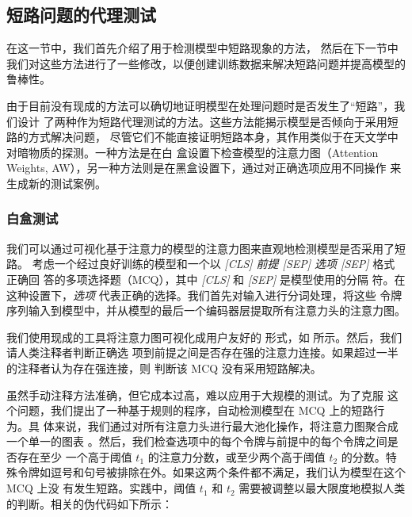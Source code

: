 \subsection{短路问题的代理测试}
\label{sec3:approach1}
在这一节中，我们首先介绍了用于检测模型中短路现象的方法，
然后在下一节中我们对这些方法进行了一些修改，以便创建训练数据来解决短路问题并提高模型的鲁棒性。

由于目前没有现成的方法可以确切地证明模型在处理问题时是否发生了``短路''，我们设计
了两种作为短路代理测试的方法。这些方法能揭示模型是否倾向于采用短路的方式解决问题，
尽管它们不能直接证明短路本身，其作用类似于在天文学中对暗物质的探测。一种方法是在白
盒设置下检查模型的注意力图（Attention Weights, AW），另一种方法则是在黑盒设置下，通过对正确选项应用不同操作
来生成新的测试案例。
\subsubsection{白盒测试}

我们可以通过可视化基于注意力的模型的注意力图来直观地检测模型是否采用了短路。
考虑一个经过良好训练的模型和一个以 \textit{[CLS] 前提 [SEP] 选项 [SEP]} 格式正确回
答的多项选择题（MCQ），其中 \textit{[CLS]} 和 \textit{[SEP]} 是模型使用的分隔
符。在这种设置下，\textit{选项} 代表正确的选择。我们首先对输入进行分词处理，将这些
令牌序列输入到模型中，并从模型的最后一个编码器层提取所有注意力头的注意力图。

我们使用现成的工具\cite{vig2019multiscale}将注意力图可视化成用户友好的
形式，如 所示。然后，我们请人类注释者判断正确选
项到前提之间是否存在强的注意力连接。如果超过一半的注释者认为存在强连接，则
判断该 MCQ 没有采用短路解决。


虽然手动注释方法准确，但它成本过高，难以应用于大规模的测试。为了克服
这个问题，我们提出了一种基于规则的程序，自动检测模型在 MCQ 上的短路行为。具
体来说，我们通过对所有注意力头进行最大池化操作，将注意力图聚合成一个单一的图表
。然后，我们检查选项中的每个令牌与前提中的每个令牌之间是否存在至少
一个高于阈值 \( t_1 \) 的注意力分数，或至少两个高于阈值 \( t_2 \) 的分数。特
殊令牌如逗号和句号被排除在外。如果这两个条件都不满足，我们认为模型在这个 MCQ 上没
有发生短路。实践中，阈值 \( t_1 \) 和 \( t_2 \) 需要被调整以最大限度地模拟人类
的判断。相关的伪代码如下所示：

